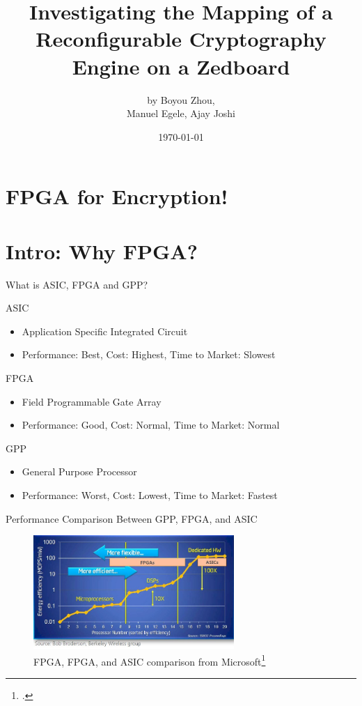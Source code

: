 \documentclass[t]{beamer}
\title[FPGA for ENC!]{Investigating the Mapping of a Reconfigurable Cryptography Engine on a Zedboard}
\author[bobzhou@bu.edu]{by Boyou Zhou,\\Manuel Egele, Ajay Joshi}
\date[\today]{\today}
\begin{document}
\maketitle

\section*{FPGA for Encryption!}

\section{Intro: Why FPGA?}
\begin{frame}{What is ASIC, FPGA and GPP?}
    \begin{block}{ASIC}
        \begin{itemize}
            \item Application Specific Integrated Circuit
            \item Performance: Best, Cost: Highest, Time to Market: Slowest
        \end{itemize}
    \end{block}
    \begin{block}{FPGA}
        \begin{itemize}
            \item Field Programmable Gate Array
            \item Performance: Good, Cost: Normal, Time to Market: Normal 
        \end{itemize}
    \end{block}
    \begin{block}{GPP}
       \begin{itemize}
            \item General Purpose Processor
            \item Performance: Worst, Cost: Lowest, Time to Market: Fastest
       \end{itemize} 
    \end{block}
\end{frame}

\begin{frame}{Performance Comparison Between GPP, FPGA, and ASIC}
    \begin{figure}
        \includegraphics[width=3in]{img/microsoft-fpga-vs-cpu-vs-asic.png}
        \caption{FPGA, FPGA, and ASIC comparison from Microsoft\footcite{http://www.theplatform.net/2015/03/30/why-intel-might-buy-fpga-maker-altera}}
        \label{fig:performance-comparison}
    \end{figure}
\end{frame}
\end{document}
